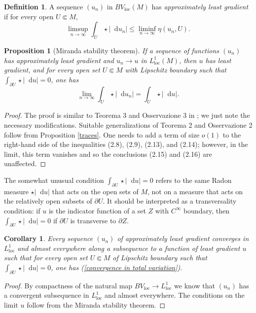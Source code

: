 \documentclass[reqno,10pt]{amsart}
\newcommand*\dif{\mathop{}\!\mathrm{d}}
\newcommand{\dfn}[1]{\emph{#1}\index{#1}}
\newcommand{\loc}{\mathrm{loc}}
\newtheorem{proposition}[theorem]{Proposition}
\newtheorem{corollary}[theorem]{Corollary}
\theoremstyle{definition}
\newtheorem{definition}[theorem]{Definition}
\numberwithin{equation}{section}
\begin{document}
\begin{definition}
A sequence $(u_n)$ in $BV_\loc(M)$ has \dfn{approximately least gradient} if for every open $U \Subset M$,
$$\limsup_{n \to \infty} \int_U \star |\dif u_n| \leq \liminf_{n \to \infty} \eta(u_n, U).$$
\end{definition}

\begin{proposition}[Miranda stability theorem]\label{Miranda convergence}
If a sequence of functions $(u_n)$ has approximately least gradient and $u_n \to u$ in $L^1_\loc(M)$, then $u$ has least gradient, and for every open set $U \Subset M$ with Lipschitz boundary such that $\int_{\partial U} \star |\dif u| = 0$, one has
\begin{equation}\label{convergence in total variation}
\lim_{n \to \infty} \int_U \star |\dif u_n| = \int_U \star |\dif u|.
\end{equation}
\end{proposition}
\begin{proof}
The proof is similar to Teorema 3 and Osservazione 3 in \cite{Miranda67}; we just note the necessary modifications.
Suitable generalizations of Teorema 2 and Osservazione 2 follow from Proposition \ref{traces}.
One needs to add a term of size $o(1)$ to the right-hand side of the inequalities (2.8), (2.9), (2.13), and (2.14); however, in the limit, this term vanishes and so the conclusions (2.15) and (2.16) are unaffected.
\end{proof}

The somewhat unusual condition $\int_{\partial U} \star |\dif u| = 0$ refers to the same Radon measure $\star |\dif u|$ that acts on the open sets of $M$, not on a measure that acts on the relatively open subsets of $\partial U$.
It should be interpreted as a transversality condition: if $u$ is the indicator function of a set $Z$ with $C^\infty$ boundary, then $\int_{\partial U} \star |\dif u| = 0$ if $\partial U$ is transverse to $\partial Z$.

\begin{corollary}\label{compactness}
Every sequence $(u_n)$ of approximately least gradient converges in $L^1_\loc$ and almost everywhere along a subsequence to a function of least gradient $u$ such that for every open set $U \Subset M$ of Lipschitz boundary such that $\int_{\partial U} \star |\dif u| = 0$, one has (\ref{convergence in total variation}).
\end{corollary}
\begin{proof}
By compactness of the natural map $BV_\loc \to L^1_\loc$ we know that $(u_n)$ has a convergent subsequence in $L^1_\loc$ and almost everywhere.
The conditions on the limit $u$ follow from the Miranda stability theorem.
\end{proof}
\end{document}
